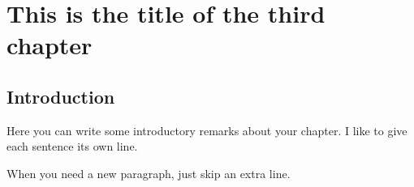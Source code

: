 	\chapter{This is the title of the third chapter}
	\newpage


\section{Introduction}

Here you can write some introductory remarks about your chapter.
I like to give each sentence its own line.

When you need a new paragraph, just skip an extra line.


\begin{comment}
	
	{}

	
\end{comment}
